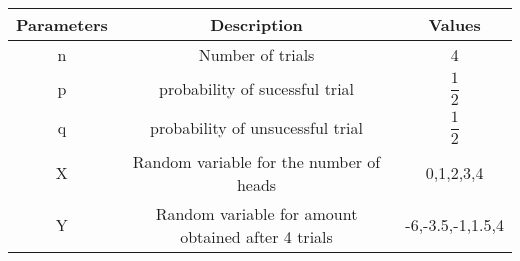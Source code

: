 
\begin{tabular}{|c|c|c|}
\hline
Parameters  & Description  & Values\\
\hline
n&Number of trials&4                           \\
\hline
p&probability of sucessful trial&$ \dfrac{1}{2}$\\
\hline
q&probability of unsucessful trial&$ \dfrac{1}{2}$\\
\hline
X&Random variable for the number of heads&0,1,2,3,4\\
\hline
Y&Random variable for amount obtained after 4 trials&-6,-3.5,-1,1.5,4\\ 
\hline



\end{tabular}
